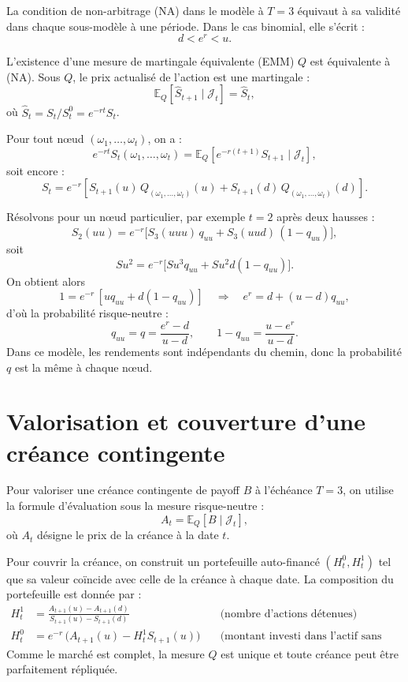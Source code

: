 \documentclass[12pt,a4paper]{article}
\numberwithin{equation}{section}
\theoremstyle{plain} %
\theoremstyle{definition} %
\theoremstyle{remark} %
\theoremstyle{myexample}
\theoremstyle{definition}
\newcommand{\E}{\mathbb{E}}
\begin{document}
La condition de non-arbitrage (NA) dans le modèle à $T=3$ équivaut à sa validité dans chaque sous-modèle à une période.  
Dans le cas binomial, elle s’écrit :
\[
d < e^r < u.
\]

L’existence d’une mesure de martingale équivalente (EMM) $Q$ est équivalente à (NA).  
Sous $Q$, le prix actualisé de l’action est une martingale :
\[
\E_Q[\hat{S}_{t+1} \mid \mathcal{J}_t] = \hat{S}_t,
\]
où $\hat{S}_t = S_t / S_t^0 = e^{-rt} S_t$.

Pour tout nœud $(\omega_1, \dots, \omega_t)$, on a :
\[
e^{-rt} S_t(\omega_1, \dots, \omega_t)
= \E_Q[e^{-r(t+1)} S_{t+1} \mid \mathcal{J}_t],
\]
soit encore :
\[
S_t = e^{-r} \left[ S_{t+1}(u)\, Q_{(\omega_1,\dots,\omega_t)}(u)
+ S_{t+1}(d)\, Q_{(\omega_1,\dots,\omega_t)}(d) \right].
\]

Résolvons pour un nœud particulier, par exemple $t=2$ après deux hausses :
\[
S_2(uu) = e^{-r} \big[S_3(uuu)\, q_{uu} + S_3(uud)\,(1-q_{uu})\big],
\]
soit
\[
S u^2 = e^{-r} \big[S u^3 q_{uu} + S u^2 d (1-q_{uu})\big].
\]
On obtient alors
\[
1 = e^{-r}\,[u q_{uu} + d(1-q_{uu})]
\quad\Rightarrow\quad
e^r = d + (u-d) q_{uu},
\]
d’où la probabilité risque-neutre :
\[
q_{uu} = q = \frac{e^r - d}{u - d}, \qquad
1-q_{uu} = \frac{u - e^r}{u - d}.
\]
Dans ce modèle, les rendements sont indépendants du chemin, donc la probabilité $q$ est la même à chaque nœud.

\section{Valorisation et couverture d’une créance contingente}

Pour valoriser une créance contingente de payoff $B$ à l’échéance $T=3$, on utilise la formule d’évaluation sous la mesure risque-neutre :
\[
A_t = \E_Q[B \mid \mathcal{J}_t],
\]
où $A_t$ désigne le prix de la créance à la date $t$.

Pour couvrir la créance, on construit un portefeuille auto-financé $(H_t^0,H_t^1)$ tel que sa valeur coïncide avec celle de la créance à chaque date.  
La composition du portefeuille est donnée par :
\begin{align*}
H_t^1 &= \frac{A_{t+1}(u) - A_{t+1}(d)}{S_{t+1}(u) - S_{t+1}(d)}
\quad &\text{(nombre d’actions détenues)}\\
H_t^0 &= e^{-r}\,\big(A_{t+1}(u) - H_t^1 S_{t+1}(u)\big)
\quad &\text{(montant investi dans l’actif sans risque).}
\end{align*}
Comme le marché est complet, la mesure $Q$ est unique et toute créance peut être parfaitement répliquée.
\end{document}
